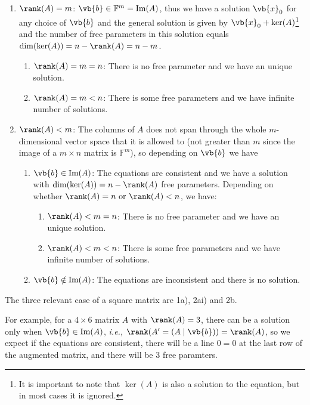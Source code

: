 \documentclass[a4paper,12pt]{report}
\begin{document}
\begin{enumerate}
    \item \(\rank (A) = m\): \(\vb{b} \in \mathbb{F}^{m} = \text{Im} (A)\), thus we have a solution \(\vb{x} _{0} \) for any choice of \(\vb{b} \) and the general solution is given by \(\vb{x} _{0} + \ker (A) \)\footnote{It is important to note that \(\ker (A)\) is also a solution to the equation, but in most cases it is ignored.} and the number of free parameters in this solution equals \(\dim (\ker (A)) = n - \rank (A) = n-m\).   
    \begin{enumerate}
        \item \(\rank (A) = m = n\): There is no free parameter and we have an unique solution.
        \item \(\rank (A) = m < n\): There is some free parameters and we have infinite number of solutions.  
    \end{enumerate}  
    \item \(\rank (A) < m\): The columns of \(A\) does not span through the whole \(m\)-dimensional vector space that it is allowed to (not greater than \(m\) since the image of a \(m \times n\) matrix is \(\mathbb{F}^{m} \)), so depending on \(\vb{b} \) we have \begin{enumerate}
        \item \(\vb{b} \in  \text{Im}(A) \): The equations are consistent and we have a solution with \(\dim (\ker (A)) = n - \rank (A)\) free parameters. Depending on whether \(\rank (A) = n \text { or } \rank (A) < n\), we have: 
        \begin{enumerate}
            \item \(\rank (A) < m = n\): There is no free parameter and we have an unique solution.
            \item \(\rank (A) < m < n\): There is some free parameters and we have infinite number of solutions.  
        \end{enumerate}
        \item \(\vb{b} \notin \text{Im}(A) \): The equations are inconsistent and there is no solution.  
    \end{enumerate}  
\end{enumerate}

The three relevant case of a square matrix are 1a), 2ai) and 2b.

For example, for a \(4 \times 6\) matrix \(A\) with \(\rank (A) = 3\), there can be a solution only when \(\vb{b} \in  \text{Im}(A) \), \textit{i.e.,} \(\rank (A' = (A \mid \vb{b} )) = \rank (A)\), so we expect if the equations are consistent, there will be a line \(0 = 0\) at the last row of the augmented matrix, and there will be 3 free paramters.     
\end{document}
